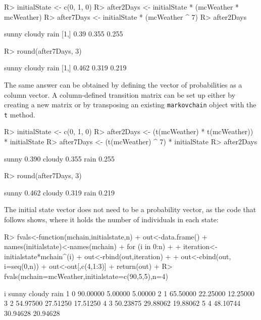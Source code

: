 \documentclass[
  nojss]{jss}
\begin{document}
\begin{CodeChunk}
\begin{CodeInput}
R> initialState <- c(0, 1, 0)
R> after2Days <- initialState * (mcWeather * mcWeather)
R> after7Days <- initialState * (mcWeather ^ 7)
R> after2Days
\end{CodeInput}
\begin{CodeOutput}
     sunny cloudy  rain
[1,]  0.39  0.355 0.255
\end{CodeOutput}
\begin{CodeInput}
R> round(after7Days, 3)
\end{CodeInput}
\begin{CodeOutput}
     sunny cloudy  rain
[1,] 0.462  0.319 0.219
\end{CodeOutput}
\end{CodeChunk}

The same answer can be obtained by defining the vector of probabilities as a column vector. A column-defined transition matrix can be set up either by creating a new matrix or by transposing an existing \texttt{markovchain} object with the \texttt{t} method.

\begin{CodeChunk}
\begin{CodeInput}
R> initialState <- c(0, 1, 0)
R> after2Days <- (t(mcWeather) * t(mcWeather)) * initialState
R> after7Days <- (t(mcWeather) ^ 7) * initialState
R> after2Days
\end{CodeInput}
\begin{CodeOutput}
        [,1]
sunny  0.390
cloudy 0.355
rain   0.255
\end{CodeOutput}
\begin{CodeInput}
R> round(after7Days, 3)
\end{CodeInput}
\begin{CodeOutput}
        [,1]
sunny  0.462
cloudy 0.319
rain   0.219
\end{CodeOutput}
\end{CodeChunk}

The initial state vector does not need to be a probability vector, as the code that follows shows, where it holds the number of individuals in each state:

\begin{CodeChunk}
\begin{CodeInput}
R> fvals<-function(mchain,initialstate,n) {
+   out<-data.frame()
+   names(initialstate)<-names(mchain)
+   for (i in 0:n)
+   {
+     iteration<-initialstate*mchain^(i)
+     out<-rbind(out,iteration)
+   }
+   out<-cbind(out, i=seq(0,n))
+   out<-out[,c(4,1:3)]
+   return(out)
+ }
R> fvals(mchain=mcWeather,initialstate=c(90,5,5),n=4)
\end{CodeInput}
\begin{CodeOutput}
  i    sunny   cloudy     rain
1 0 90.00000  5.00000  5.00000
2 1 65.50000 22.25000 12.25000
3 2 54.97500 27.51250 17.51250
4 3 50.23875 29.88062 19.88062
5 4 48.10744 30.94628 20.94628
\end{CodeOutput}
\end{CodeChunk}
\end{document}
